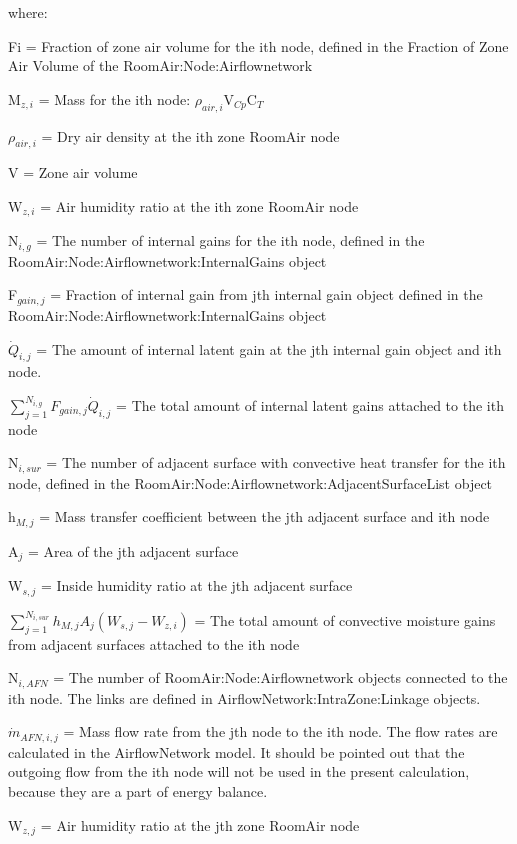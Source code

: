 where:

Fi = Fraction of zone air volume for the ith node, defined in the Fraction of Zone Air Volume of the RoomAir:Node:Airflownetwork

M\(_{z,i}\) = Mass for the ith node: \(\rho_{air,i}\)V\(_{Cp}\)C\(_{T}\)

\(\rho_{air,i}\) = Dry air density at the ith zone RoomAir node

V = Zone air volume

W\(_{z,i}\) = Air humidity ratio at the ith zone RoomAir node

N\(_{i,g}\) = The number of internal gains for the ith node, defined in the \\ RoomAir:Node:Airflownetwork:InternalGains object

F\(_{gain,j}\) = Fraction of internal gain from jth internal gain object defined in the RoomAir:Node:Airflownetwork:InternalGains object

\({\dot Q}_{i,j}\) = The amount of internal latent gain at the jth internal gain object and ith node.

\({\sum\limits_{j = 1}^{N_{i,g}} F_{gain,j}{\dot Q}_{i,j}}\) = The total amount of internal latent gains attached to the ith node

N\(_{i,sur}\) = The number of adjacent surface with convective heat transfer for the ith node, defined in the RoomAir:Node:Airflownetwork:AdjacentSurfaceList object

h\(_{M,j}\) = Mass transfer coefficient between the jth adjacent surface and ith node

A\(_{j}\) = Area of the jth adjacent surface

W\(_{s,j}\) = Inside humidity ratio at the jth adjacent surface

\({\sum\limits_{j = 1}^{N_{i,sur}} h_{M,j} A_j \left( W_{s,j} - W_{z,i}\right)}\) = The total amount of convective moisture gains from adjacent surfaces attached to the ith node

N\(_{i,AFN}\) = The number of RoomAir:Node:Airflownetwork objects connected to the ith node. The links are defined in AirflowNetwork:IntraZone:Linkage objects.

\({\dot m}_{AFN,i,j}\) = Mass flow rate from the jth node to the ith node. The flow rates are calculated in the AirflowNetwork model. It should be pointed out that the outgoing flow from the ith node will not be used in the present calculation, because they are a part of energy balance.

W\(_{z,j}\) = Air humidity ratio at the jth zone RoomAir node


